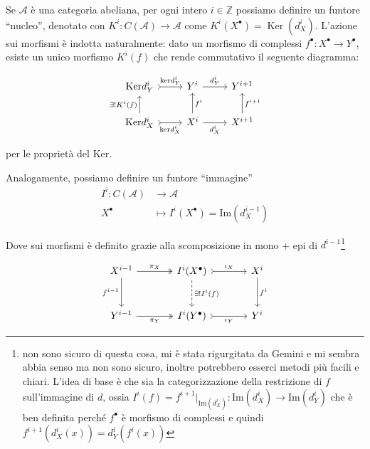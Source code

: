 Se $\mathcal{A}$ è una categoria abeliana, per ogni intero $i \in \mathbb{Z}$
possiamo definire un funtore ``nucleo'', denotato con $K^i: C(\mathcal{A}) \to
\mathcal{A}$ come $K^i(X^\bullet) = \operatorname{Ker}(d_X^i)$.
L'azione sui morfismi è indotta naturalmente: dato un morfismo di complessi
$f^\bullet: X^\bullet \to Y^\bullet$, esiste un unico morfismo $K^i(f)$ che
rende commutativo il seguente diagramma:


\[\begin{tikzcd}
    \mathrm{Ker}d_Y^{i} & Y^{i} & Y^{i+1}\\
    \mathrm{Ker}d_X^{i} & X^{i} & X^{i+1}
	\arrow["{\mathrm{ker}d_Y^i}", tail, from=1-1, to=1-2]
	\arrow["{d_Y^i}", from=1-2, to=1-3]
	\arrow["{\exists!K^i(f)}", from=2-1, to=1-1]
	\arrow["{\mathrm{ker}d_X^i}"', tail, from=2-1, to=2-2]
	\arrow["{f^i}"', from=2-2, to=1-2]
	\arrow["{d_X^i}"', from=2-2, to=2-3]
	\arrow["{f^{i+1}}"', from=2-3, to=1-3]
\end{tikzcd}\]

per le proprietà del \(\mathrm{Ker}\).

Analogamente, possiamo definire un funtore ``immagine''
\begin{align*}
    I^{i}: C{(\mathcal{A})} &\longrightarrow \mathcal{A} \\
     X^\bullet &\longmapsto I^{i}(X^\bullet) = \mathrm{Im}{(d_X^{i-1})}
\end{align*}

Dove sui morfismi è definito grazie alla scomposizione in mono + epi di
\(d^{i-1}\)\footnote{non sono sicuro di questa cosa, mi è stata rigurgitata da
    Gemini e mi sembra abbia senso ma non sono sicuro, inoltre potrebbero
esserci metodi più facili e chiari. L'idea di base è che sia la categorizzazione
della restrizione di \(f\) sull'immagine di \(d\), ossia \(I^{i}{(f)} =
f^{i+1}|_{\mathrm{Im}(d_X^{i})} : \mathrm{Im}{(d_X^{i})} \to
\mathrm{Im}{(d_Y^{i})} \) che è ben definita perché \(f^\bullet\) è morfismo di
complessi e quindi \(f^{i+1}{(d_X^{i}{(x)})} = d_Y^{i}{(f^{i}{(x)})}\) } 

$$ \begin{tikzcd}[column sep=large, row sep=large]
    X^{i-1} \arrow[r, "\pi_X", two heads] \arrow[d, "f^{i-1}"'] &
    I^i(X^\bullet) \arrow[r, "\iota_X", tail] \arrow[d, "\exists! I^i(f)", dashed] & 
    X^i \arrow[d, "f^i"] \\
    Y^{i-1} \arrow[r, "\pi_Y"', two heads] & I^i(Y^\bullet) \arrow[r,
    "\iota_Y"', tail] & Y^i
\end{tikzcd} $$

